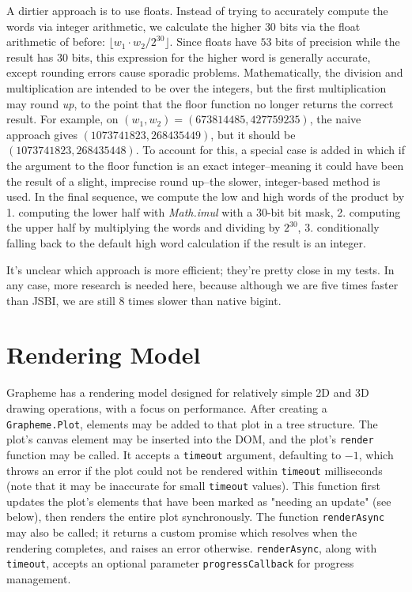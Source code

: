 \documentclass{article}
\begin{document}
A dirtier approach is to use floats. Instead of trying to accurately compute the words via integer arithmetic, we calculate the higher $30$ bits via the float arithmetic of before: $\lfloor w_1\cdot w_2 / 2^{30} \rfloor$. Since floats have $53$ bits of precision while the result has $30$ bits, this expression for the higher word is generally accurate, except rounding errors cause sporadic problems. Mathematically, the division and multiplication are intended to be over the integers, but the first multiplication may round \textit{up}, to the point that the floor function no longer returns the correct result. For example, on $(w_1,w_2)=(673814485,427759235)$, the naive approach gives $(1073741823, 268435449)$, but it should be $(1073741823, 268435448)$. To account for this, a special case is added in which if the argument to the floor function is an exact integer--meaning it could have been the result of a slight, imprecise round up--the slower, integer-based method is used. In the final sequence, we compute the low and high words of the product by 1. computing the lower half with \textit{Math.imul} with a $30$-bit bit mask, 2. computing the upper half by multiplying the words and dividing by $2^{30}$, 3. conditionally falling back to the default high word calculation if the result is an integer.

It's unclear which approach is more efficient; they're pretty close in my tests. In any case, more research is needed here, because although we are five times faster than JSBI, we are still 8 times slower than native bigint.

\section{Rendering Model}

Grapheme has a rendering model designed for relatively simple 2D and 3D drawing operations, with a focus on performance. After creating a \texttt{Grapheme.Plot}, elements may be added to that plot in a tree structure. The plot's canvas element may be inserted into the DOM, and the plot's \texttt{render} function may be called. It accepts a \texttt{timeout} argument, defaulting to $-1$, which throws an error if the plot could not be rendered within \texttt{timeout} milliseconds (note that it may be inaccurate for small \texttt{timeout} values). This function first updates the plot's elements that have been marked as "needing an update" (see below), then renders the entire plot synchronously. The function \texttt{renderAsync} may also be called; it returns a custom promise which resolves when the rendering completes, and raises an error otherwise. \texttt{renderAsync}, along with \texttt{timeout}, accepts an optional parameter \texttt{progressCallback} for progress management.
\end{document}

